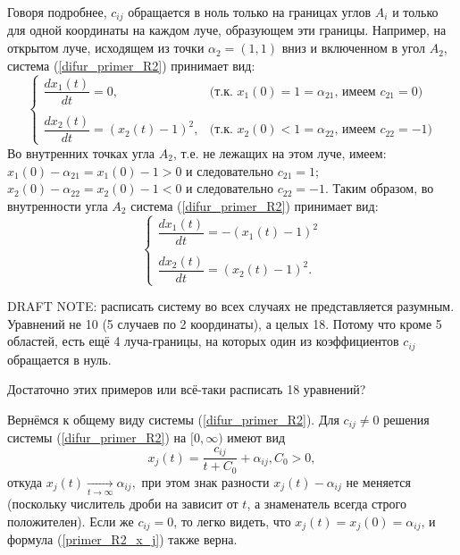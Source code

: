 Говоря подробнее,
$c_{ij}$ обращается в ноль только на границах углов $A_i$ и только для одной координаты на каждом луче,
образующем эти границы.
Например, на открытом луче, исходящем из точки $\alpha_2=(1, 1)$ вниз и включенном в угол $A_2$, система (\ref{difur_primer_R2})
принимает вид:
\begin{equation*}
	\begin{cases}
		\dfrac{dx_1(t)}{dt} = 0, &\mbox{(т.к. $x_1(0) = 1 = \alpha_{21}$, имеем $c_{21} = 0$)}
	\\\\
		\dfrac{dx_2(t)}{dt} =  (x_2(t)-1)^2,  &\mbox{(т.к. $x_2(0) < 1 = \alpha_{22}$, имеем $c_{22} = -1$)}
	\end{cases}
\end{equation*}
Во внутренних точках угла $A_2$, т.е. не лежащих на этом луче, имеем:
$x_1(0) - \alpha_{21} = x_1(0) - 1 > 0$ и следовательно $c_{21} = 1$;
$x_2(0) - \alpha_{22} = x_2(0) - 1 < 0$ и следовательно $c_{22} = -1$.
Таким образом, во внутренности угла $A_2$ система (\ref{difur_primer_R2})
принимает вид:
\begin{equation*}
	\begin{cases}
		\dfrac{dx_1(t)}{dt} =  - (x_1(t)-1)^2
	\\\\
		\dfrac{dx_2(t)}{dt} =  (x_2(t)-1)^2.
	\end{cases}
\end{equation*}


DRAFT NOTE: расписать систему во всех случаях не представляется разумным.
Уравнений не 10 (5 случаев по 2 координаты), а целых 18.
Потому что кроме 5 областей, есть ещё 4 луча-границы, на которых один из коэффициентов $c_{ij}$
обращается в нуль.

Достаточно этих примеров или всё-таки расписать 18 уравнений?

Вернёмся к общему виду системы (\ref{difur_primer_R2}).
Для $c_{ij} \neq 0$ решения системы (\ref{difur_primer_R2}) на $[0, \infty)$ имеют вид
\begin{equation}\label{primer_R2_x_j}
	x_j(t) = \frac{c_{ij}}{t+C_0}+\alpha_{ij}, C_0 > 0,
\end{equation}
откуда
$
	x_j(t) \xrightarrow[t\to \infty ]{}{\alpha_{ij}},
$
при этом знак разности $x_j(t) - \alpha_{ij}$ не меняется (поскольку числитель дроби на зависит от $t$, а знаменатель всегда строго положителен).
Если же $c_{ij}=0$, то легко видеть, что $x_j(t) = x_j(0) = \alpha_{ij}$,
и формула (\ref{primer_R2_x_j}) также верна.

